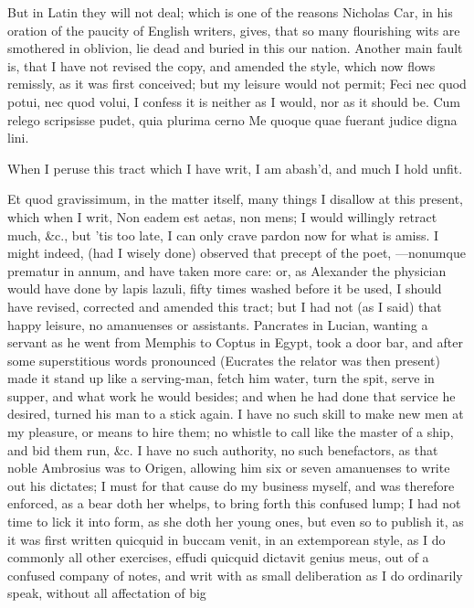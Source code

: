 {But in Latin they will not deal; which is one of the reasons
Nicholas Car, in his oration of the paucity of English writers,
gives, that so many flourishing wits are smothered in oblivion, lie
dead and buried in this our nation. Another main fault is, that I have
not revised the copy, and amended the style, which now flows remissly,
as it was first conceived; but my leisure would not permit; Feci nec
quod potui, nec quod volui, I confess it is neither as I would, nor as
it should be.
Cum relego scripsisse pudet, quia plurima cerno
Me quoque quae fuerant judice digna lini.

When I peruse this tract which I have writ,
I am abash'd, and much I hold unfit.

Et quod gravissimum, in the matter itself, many things I disallow at
this present, which when I writ, Non eadem est aetas, non mens; I
would willingly retract much, \&c., but 'tis too late, I can only crave
pardon now for what is amiss. I might indeed, (had I wisely done)
observed that precept of the poet, ---nonumque prematur in annum, and
have taken more care: or, as Alexander the physician would have done by
lapis lazuli, fifty times washed before it be used, I should have
revised, corrected and amended this tract; but I had not (as I said)
that happy leisure, no amanuenses or assistants. Pancrates in
Lucian, wanting a servant as he went from Memphis to Coptus in
Egypt, took a door bar, and after some superstitious words pronounced
(Eucrates the relator was then present) made it stand up like a
serving-man, fetch him water, turn the spit, serve in supper, and what
work he would besides; and when he had done that service he desired,
turned his man to a stick again. I have no such skill to make new men
at my pleasure, or means to hire them; no whistle to call like the
master of a ship, and bid them run, \&c. I have no such authority, no
such benefactors, as that noble Ambrosius was to Origen, allowing
him six or seven amanuenses to write out his dictates; I must for that
cause do my business myself, and was therefore enforced, as a bear doth
her whelps, to bring forth this confused lump; I had not time to lick
it into form, as she doth her young ones, but even so to publish it, as
it was first written quicquid in buccam venit, in an extemporean style,
as I do commonly all other exercises, effudi quicquid dictavit
genius meus, out of a confused company of notes, and writ with as small
deliberation as I do ordinarily speak, without all affectation of big
}
